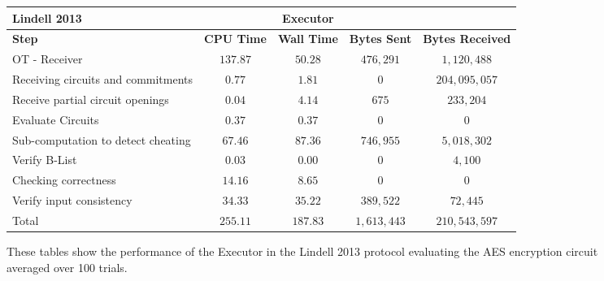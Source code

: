 \documentclass[ %
                    author={Nicholas Tutte},
                supervisor={Prof. Nigel Smart},
                    degree={MEng},
                     title={Secure Two Party Computation},
                  subtitle={A practical comparison of recent protocols},
                      type={Research - GG1K},
                      year={2015} ]{dissertation}
\begin{document}
				\begin{figure}
					\begin{tabular}{| p{3.5cm} | c c c c |}
						\hline
						\textbf{Lindell 2013} & & \textbf{Executor} & & \\
						\hline
						\textbf{Step} & \textbf{CPU Time} & \textbf{Wall Time} & \textbf{Bytes Sent} & \textbf{Bytes Received} \\
						\thickhline
						OT - Receiver & $137.87$ & $50.28$ & $476,291$ & $1,120,488$ \\
						\hline
						Receiving circuits and commitments & $0.77$ & $1.81$ & $0$ & $204,095,057$ \\
						\hline
						Receive partial circuit openings & $0.04$ & $4.14$ & $675$ & $233,204$ \\
						\hline
						Evaluate Circuits & $0.37$ & $0.37$ & $0$ & $0$ \\
						\hline
						Sub-computation to detect cheating & $67.46$ & $87.36$ & $746,955$ & $5,018,302$ \\
						\hline
						Verify B-List & $0.03$ & $0.00$ & $0$ & $4,100$ \\
						\hline
						Checking correctness & $14.16$ & $8.65$ & $0$ & $0$ \\
						\hline
						Verify input consistency & $34.33$ & $35.22$ & $389,522$ & $72,445$ \\
						\thickhline
						Total & $255.11$ & $187.83$ & $1,613,443$ & $210,543,597$ \\
						\hline
					\end{tabular}
					\caption{These tables show the performance of the Executor in the Lindell 2013 protocol evaluating the AES encryption circuit averaged over 100 trials. \label{table:L_2013_AES_Executor}}
				\end{figure}
\end{document}
